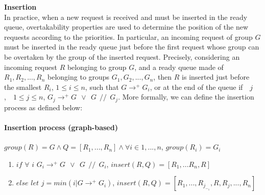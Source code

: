 \documentclass[11pt]{report}
\begin{document}
\textbf{Insertion}\\
In practice, when a new request is received and must be inserted in the ready queue, overtakability properties are used to determine the position of the new requests according to the priorities.
In particular, an incoming request of group $G$ must be inserted in the ready queue just before the first request whose group can be overtaken by the group of the inserted request. Precisely, 
considering an incoming request $R$ belonging to group $G$, and a ready queue made of $R_1,R_2,...,R_n$ belonging to groups $G_1,G_2,...,G_n$, then $R$ is inserted just before the smallest $R_i$, $1 \le i \le n$, such that $G\longrightarrow^{+}G_i$, or at the end of the queue if~\ \forall $j$,~\ $1 \le j \le n$,  $G_j\longrightarrow^{+}G~\ \vee~\ G~\ //~\ G_j$.
More formally, we can define the insertion process as defined below:
\paragraph{Insertion process (graph-based)}
$group(R)=G \wedge Q=[R_1,...,R_n] \wedge \forall i \in 1,...,n$, $group(R_i)=G_i$
\begin{enumerate}
\item $if$ $\forall$ $i$ $G_i\longrightarrow^{+}G~\ \vee~\ G~\ //~\ G_i$, $insert(R,Q)=[R_1,...R_n,R]$
\item $else$ $let$ $j=min({i|G\longrightarrow^{+}G_i})$, $insert(R, Q)=[R_1,...,R_j_-_1,R,R_j,...,R_n]$
\end{enumerate} 
\end{document}
